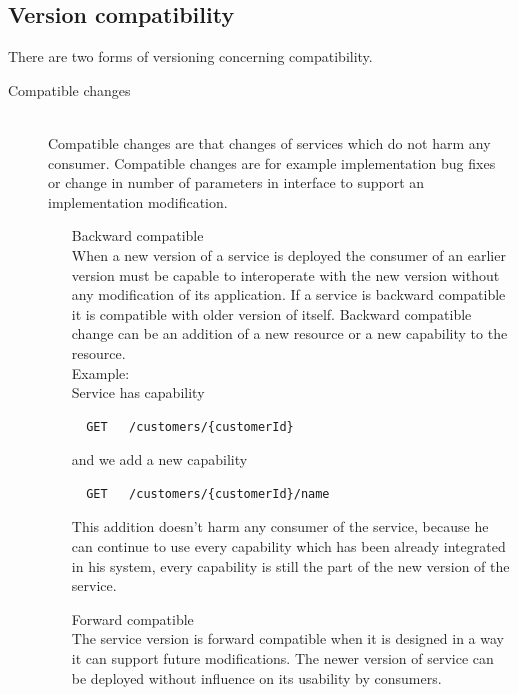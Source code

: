 \subsection{Version compatibility}
There are two forms of versioning concerning compatibility. \cite{website:service-versioning}
\begin{description}
  \item[Compatible changes] \hfill \\
  Compatible changes are that changes of services which do not harm any consumer. Compatible changes are for example implementation bug fixes or change in number of parameters in interface to support an implementation modification.
  \begin{enumerate}
    \item[Backward compatible] \hfill \\ 
  When a new version of a service is deployed the consumer of an earlier version must be capable to interoperate with the new version without any modification of its application. If a service is backward compatible it is compatible with older version of itself. Backward compatible change can be an addition of a new resource or a new capability to the resource. \hfill \\ 
  Example: \hfill \\ 
  Service has capability \hfill \\ 
  \begin{lstlisting}
  GET   /customers/{customerId}
  \end{lstlisting}
  and we add a new capability 
  \begin{lstlisting}
  GET   /customers/{customerId}/name
  \end{lstlisting}

  This addition doesn't harm any consumer of the service, because he can continue to use every capability which has been already integrated in his system, every capability is still the part of the new version of the service. 
  \item[Forward compatible] \hfill \\
  The service version is forward compatible when it is designed in a way it can support future modifications. The newer version of service can be deployed without influence on its usability by consumers. 
  \end{enumerate}
  

\end{description}
